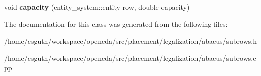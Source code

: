 \begin{DoxyCompactItemize}
\item 
\hypertarget{classophidian_1_1placement_1_1legalization_1_1abacus_1_1subrows_ac0a55100b9e2942f55f332905dc82345}{void {\bfseries capacity} (entity\-\_\-system\-::entity row, double capacity)}\label{classophidian_1_1placement_1_1legalization_1_1abacus_1_1subrows_ac0a55100b9e2942f55f332905dc82345}

\end{DoxyCompactItemize}


The documentation for this class was generated from the following files\-:\begin{DoxyCompactItemize}
\item 
/home/csguth/workspace/openeda/src/placement/legalization/abacus/subrows.\-h\item 
/home/csguth/workspace/openeda/src/placement/legalization/abacus/subrows.\-cpp\end{DoxyCompactItemize}
